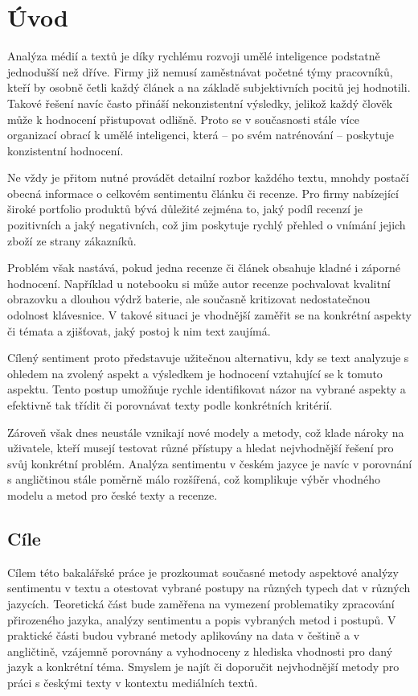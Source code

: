\chapter*{Úvod}


Analýza médií a textů je díky rychlému rozvoji umělé inteligence podstatně jednodušší než dříve. Firmy již nemusí zaměstnávat početné týmy pracovníků, kteří by osobně četli každý článek a na základě subjektivních pocitů jej hodnotili. Takové řešení navíc často přináší nekonzistentní výsledky, jelikož každý člověk může k hodnocení přistupovat odlišně. Proto se v současnosti stále více organizací obrací k umělé inteligenci, která -- po svém natrénování -- poskytuje konzistentní hodnocení.

Ne vždy je přitom nutné provádět detailní rozbor každého textu, mnohdy postačí obecná informace o celkovém sentimentu článku či recenze. Pro firmy nabízející široké portfolio produktů bývá důležité zejména to, jaký podíl recenzí je pozitivních a jaký negativních, což jim poskytuje rychlý přehled o vnímání jejich zboží ze strany zákazníků.

Problém však nastává, pokud jedna recenze či článek obsahuje kladné i záporné hodnocení. Například u notebooku si může autor recenze pochvalovat kvalitní obrazovku a dlouhou výdrž baterie, ale současně kritizovat nedostatečnou odolnost klávesnice. V takové situaci je vhodnější zaměřit se na konkrétní aspekty či témata a zjišťovat, jaký postoj k nim text zaujímá.

Cílený sentiment proto představuje užitečnou alternativu, kdy se text analyzuje s ohledem na zvolený aspekt a výsledkem je hodnocení vztahující se k tomuto aspektu. Tento postup umožňuje rychle identifikovat názor na vybrané aspekty a efektivně tak třídit či porovnávat texty podle konkrétních kritérií.

Zároveň však dnes neustále vznikají nové modely a metody, což klade nároky na uživatele, kteří musejí testovat různé přístupy a hledat nejvhodnější řešení pro svůj konkrétní problém. Analýza sentimentu v českém jazyce je navíc v porovnání s angličtinou stále poměrně málo rozšířená, což komplikuje výběr vhodného modelu a metod pro české texty a recenze.

\section*{Cíle}
{}

Cílem této bakalářské práce je prozkoumat současné metody aspektové analýzy sentimentu v textu a otestovat vybrané postupy na různých typech dat v různých jazycích. Teoretická část bude zaměřena na vymezení problematiky zpracování přirozeného jazyka, analýzy sentimentu a popis vybraných metod i postupů. V praktické části budou vybrané metody aplikovány na data v češtině a v angličtině, vzájemně porovnány a vyhodnoceny z hlediska vhodnosti pro daný jazyk a konkrétní téma. Smyslem je najít či doporučit nejvhodnější metody pro práci s českými texty v kontextu mediálních textů.
